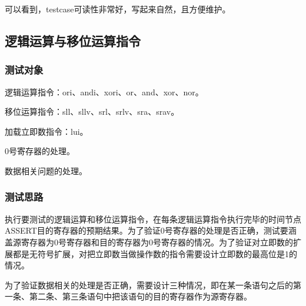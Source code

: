 \documentclass[11pt,utf8]{article}
\begin{document}
{{可以看到，testcase可读性非常好，写起来自然，且方便维护。
}

\subsection{逻辑运算与移位运算指令} {
\subsubsection{测试对象} {
逻辑运算指令：ori、andi、xori、or、and、xor、nor。

移位运算指令：sll、sllv、srl、srlv、sra、srav。

加载立即数指令：lui。

0号寄存器的处理。

数据相关问题的处理。
}
\subsubsection{测试思路} {
执行要测试的逻辑运算和移位运算指令，在每条逻辑运算指令执行完毕的时间节点ASSERT目的寄存器的预期结果。为了验证0号寄存器的处理是否正确，测试要涵盖源寄存器为0号寄存器和目的寄存器为0号寄存器的情况。为了验证对立即数的扩展都是无符号扩展，对把立即数当做操作数的指令需要设计立即数的最高位是1的情况。

为了验证数据相关的处理是否正确，需要设计三种情况，即在某一条语句之后的第一条、第二条、第三条语句中把该语句的目的寄存器作为源寄存器。
}
}}
\end{document}
